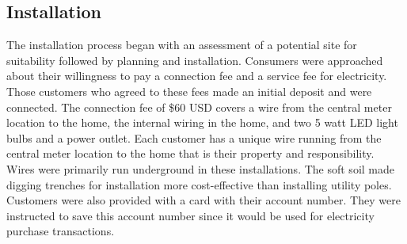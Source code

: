 \documentclass{sig-alternate}
\begin{document}
\subsection{Installation}
The installation process began with an assessment of a potential site for
suitability followed by planning and installation.
Consumers were
approached about their willingness to pay a connection fee and a service
fee for electricity.
Those customers who agreed to these fees made an initial deposit
and were connected.
The connection fee of \$60 USD covers a wire from the central meter location
to the home, the internal wiring in the home, and two 5 watt LED light bulbs and a
power outlet.
Each customer has a unique wire running from the central meter location to
the home that is their property and responsibility.
Wires were primarily run underground in these installations.
The soft soil made digging trenches for installation more cost-effective than
installing utility poles.
Customers were also provided with a card with their account number.
They were instructed to save this account number since it would be used
for electricity purchase transactions.
\end{document}
